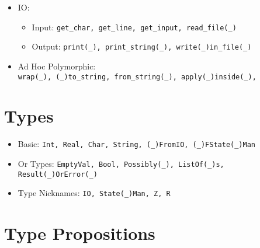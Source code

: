 \documentclass[diploma]{softlab-thesis}
\begin{document}
\begin{itemize}
\begin{itemize}
  \item IO:
    \begin{itemize}
    \item Input: \verb|get_char, get_line, get_input, read_file(_)|
    \item Output:
      \verb|print(_), print_string(_), write(_)in_file(_)|
    \end{itemize}

  \item Ad Hoc Polymorphic:\\
  \verb|wrap(_), (_)to_string, from_string(_), apply(_)inside(_), |

  \end{itemize}
\end{itemize}

\section{Types}

\begin{itemize}
  \item
  Basic: \verb|Int, Real, Char, String, (_)FromIO, (_)FState(_)Man|
  \item
  Or Types:
  \verb|EmptyVal, Bool, Possibly(_), ListOf(_)s, Result(_)OrError(_)|
  \item
  Type Nicknames: \verb|IO, State(_)Man, Z, R|
\end{itemize}

\newpage

\section{Type Propositions}
\end{document}
